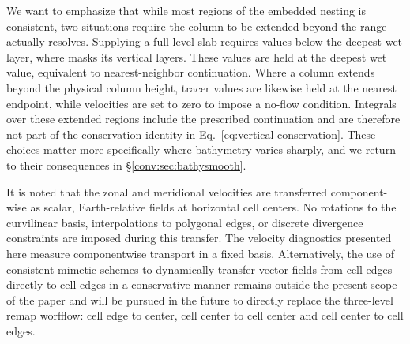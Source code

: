 We want to emphasize that while most regions of the embedded nesting is consistent, two situations require the column to be extended beyond the range \MPAS actually resolves. Supplying a full level slab requires values below the deepest wet \MPAS layer, where \MPAS masks its vertical layers. These values are held at the deepest wet value, equivalent to nearest-neighbor continuation.%
Where a \ROMS column extends beyond the physical \MPAS column height, tracer values are likewise held at the nearest endpoint, while velocities are set to zero to impose a no-flow condition. Integrals over these extended \ROMS regions include the prescribed continuation and are therefore not part of the conservation identity in Eq.~\eqref{eq:vertical-conservation}. These choices matter more specifically where bathymetry varies sharply, and we return to their consequences in \S\ref{conv:sec:bathysmooth}.



It is noted that the zonal and meridional velocities are transferred component-wise as scalar, Earth-relative fields at horizontal cell centers. No rotations to the curvilinear basis, interpolations to polygonal edges, or discrete divergence constraints are imposed during this transfer. The velocity diagnostics presented here measure componentwise transport in a fixed basis. Alternatively, the use of consistent mimetic schemes to dynamically transfer vector fields from \MPAS cell edges directly to \ROMS cell edges in a conservative manner remains outside the present scope of the paper and will be pursued in the future to directly replace the three-level remap worfflow: \MPAS cell edge to center, \MPAS cell center to \ROMS cell center and \ROMS cell center to cell edges.



